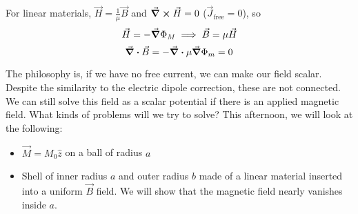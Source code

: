 \documentclass[a4paper,twoside,master.tex]{subfiles}
\begin{document}
For linear materials, $ \vec{H} = \frac{1}{\mu} \vec{B} $ and $ \curl{ \vec{H} } = 0 $ ($ \vec{J}_{\text{free}} =0$), so
\begin{equation}
    \vec{H} = - \grad{\Phi_M} \implies \vec{B} = \mu \vec{H}
\end{equation}
\begin{equation}
    \div{ \vec{B}} = - \div{\mu \grad{\Phi_m}} = 0
\end{equation}

The philosophy is, if we have no free current, we can make our field scalar. Despite the similarity to the electric dipole correction, these are not connected. We can still solve this field as a scalar potential if there is an applied magnetic field. What kinds of problems will we try to solve? This afternoon, we will look at the following:
\begin{itemize}
    \item $ \vec{M} = M_0 \hat{z} $ on a ball of radius $ a $
    \item Shell of inner radius $ a $ and outer radius $ b $ made of a linear material inserted into a uniform $ \vec{B} $ field. We will show that the magnetic field nearly vanishes inside $ a $.
\end{itemize}
\end{document}
